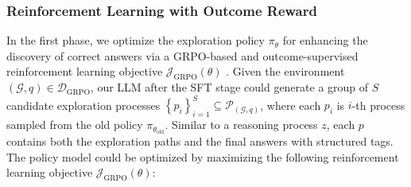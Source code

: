 \subsubsection{Reinforcement Learning with Outcome Reward}\label{subsubsec:grpo}
In the first phase, we optimize the exploration policy $\pi_\theta$ for enhancing the discovery of correct answers via a GRPO-based and outcome-supervised reinforcement learning objective $\mathcal{J}_{\textrm{GRPO}}(\theta)$ .
Given the environment $(\mathcal{G}, q) \in \mathcal{D}_\textrm{GRPO}$, our LLM after the SFT stage could generate a group of $S$ candidate exploration processes $\left \{ p_i \right \} _{i=1}^{S} \subseteq \mathcal{P}_{(\mathcal{G}, q)}$, where each $p_i$ is $i$-th process sampled from the old policy $\pi_{\theta_{\textrm{old}}}$.
Similar to a reasoning process $z$, each $p$ contains both the exploration paths and the final answers with structured tags.
The policy model could be optimized by maximizing the following reinforcement learning objective $\mathcal{J}_{\textrm{GRPO}}(\theta)$:


